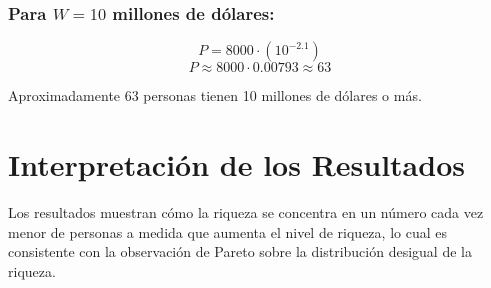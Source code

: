 \documentclass{article}
\begin{document}
\subsubsection*{Para \(W = 10\) millones de dólares:}

\[
P = 8000 \cdot (10^{-2.1})
\]
\[
P \approx 8000 \cdot 0.00793 \approx 63
\]

Aproximadamente 63 personas tienen 10 millones de dólares o más.

\section*{Interpretación de los Resultados}

Los resultados muestran cómo la riqueza se concentra en un número cada vez menor de personas a medida que aumenta el nivel de riqueza, lo cual es consistente con la observación de Pareto sobre la distribución desigual de la riqueza.
\end{document}
